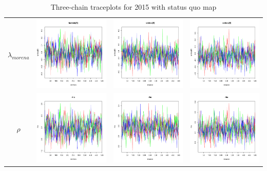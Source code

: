 \documentclass[letter,12pt]{article}
\begin{document}
\begin{table}
\begin{tabular}{cccc}
    $\lambda_{morena}$ & \includegraphics[width=.15\columnwidth]{../graphs/traceplots/2015d0v_6.pdf} &
                        \includegraphics[width=.15\columnwidth]{../graphs/traceplots/2015d0vbar_6.pdf} &
                         \includegraphics[width=.15\columnwidth]{../graphs/traceplots/2015d0wbar_6.pdf} \\
    $\rho$           & \includegraphics[width=.15\columnwidth]{../graphs/traceplots/2015d0v_7.pdf} &
                        \includegraphics[width=.15\columnwidth]{../graphs/traceplots/2015d0vbar_7.pdf} &
                         \includegraphics[width=.15\columnwidth]{../graphs/traceplots/2015d0wbar_7.pdf} \\
\end{tabular}
\caption{Three-chain traceplots for 2015 with status quo map}
\end{table}
\end{document}
